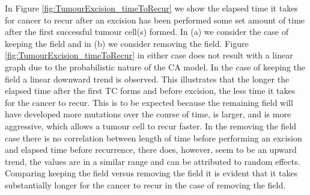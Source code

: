 \documentclass[\main/thesis.tex]{subfiles}
\begin{document}
In Figure \ref{fig:TumourExcision_timeToRecur} we show the elapsed time it takes for cancer to recur after an excision has been performed some set amount of time after the first successful tumour cell(s) formed. In (a) we consider the case of keeping the field and in (b) we consider removing the field. Figure \ref{fig:TumourExcision_timeToRecur} in either case does not result with a linear graph due to the probabilistic nature of the CA model. In the case of keeping the field a linear downward trend is observed. This illustrates that the longer the elapsed time after the first TC forms and before excision, the less time it takes for the cancer to recur. This is to be expected because the remaining field will have developed more mutations over the course of time, is larger, and is more aggressive, which allows a tumour cell to recur faster. In the removing the field case there is no correlation between length of time before performing an excision and elapsed time before recurrence, there does, however, seem to be an upward trend, the values are in a similar range and can be attributed to random effects. Comparing keeping the field versus removing the field it is evident that it takes substantially longer for the cancer to recur in the case of removing the field.  
\end{document}
